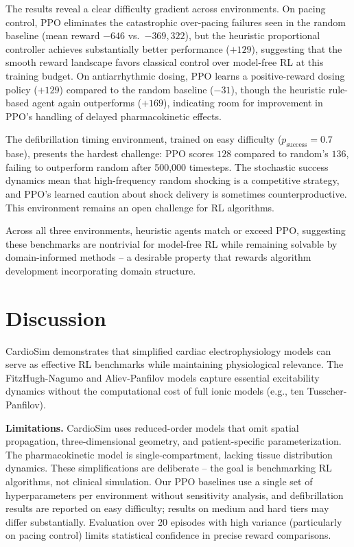 \documentclass[11pt,a4paper]{article}
\begin{document}
The results reveal a clear difficulty gradient across environments. On pacing control, PPO eliminates the catastrophic over-pacing failures seen in the random baseline (mean reward $-646$ vs.\ $-369{,}322$), but the heuristic proportional controller achieves substantially better performance ($+129$), suggesting that the smooth reward landscape favors classical control over model-free RL at this training budget. On antiarrhythmic dosing, PPO learns a positive-reward dosing policy ($+129$) compared to the random baseline ($-31$), though the heuristic rule-based agent again outperforms ($+169$), indicating room for improvement in PPO's handling of delayed pharmacokinetic effects.

The defibrillation timing environment, trained on easy difficulty ($p_{\text{success}} = 0.7$ base), presents the hardest challenge: PPO scores $128$ compared to random's $136$, failing to outperform random after 500{,}000 timesteps. The stochastic success dynamics mean that high-frequency random shocking is a competitive strategy, and PPO's learned caution about shock delivery is sometimes counterproductive. This environment remains an open challenge for RL algorithms.

Across all three environments, heuristic agents match or exceed PPO, suggesting these benchmarks are nontrivial for model-free RL while remaining solvable by domain-informed methods -- a desirable property that rewards algorithm development incorporating domain structure.

\section{Discussion}

CardioSim demonstrates that simplified cardiac electrophysiology models can serve as effective RL benchmarks while maintaining physiological relevance. The FitzHugh-Nagumo and Aliev-Panfilov models capture essential excitability dynamics without the computational cost of full ionic models (e.g., ten Tusscher-Panfilov).

\textbf{Limitations.} CardioSim uses reduced-order models that omit spatial propagation, three-dimensional geometry, and patient-specific parameterization. The pharmacokinetic model is single-compartment, lacking tissue distribution dynamics. These simplifications are deliberate -- the goal is benchmarking RL algorithms, not clinical simulation. Our PPO baselines use a single set of hyperparameters per environment without sensitivity analysis, and defibrillation results are reported on easy difficulty; results on medium and hard tiers may differ substantially. Evaluation over 20 episodes with high variance (particularly on pacing control) limits statistical confidence in precise reward comparisons.
\end{document}
